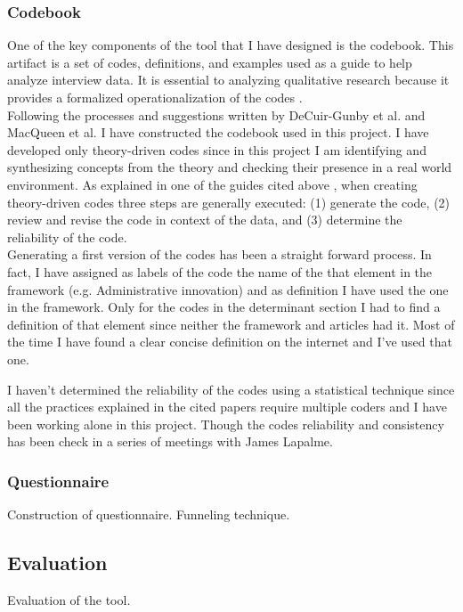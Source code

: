 \subsubsection*{Codebook}
One of the key components of the tool that I have designed is the codebook. This artifact is a set of codes, definitions, and examples used as a guide to help analyze interview data. It is essential to analyzing qualitative research because it provides a formalized operationalization of the codes \citep{CodebookGuide}. \\
Following the processes and suggestions written by DeCuir-Gunby et al. \citep{CodebookGuide} and MacQueen et al. \citep{CodebookGuide2} I have constructed the codebook used in this project.
I have developed only theory-driven codes since in this project I am identifying and synthesizing concepts from the theory and checking their presence in a real world environment. As explained in one of the guides cited above \citep{CodebookGuide}, when creating theory-driven codes three steps are generally executed: (1) generate the code, (2) review and revise the code in context of the data, and (3) determine the reliability of the code. \\

Generating a first version of the codes has been a straight forward process. In fact, I have assigned as labels of the code the name of the that element in the framework (e.g. Administrative innovation) and as definition I have used the one in the framework. Only for the codes in the determinant section I had to find a definition of that element since neither the framework and articles had it. Most of the time I have found a clear concise definition on the internet and I've used that one.


I haven't determined the reliability of the codes using a statistical technique since all the practices explained in the cited papers require multiple coders and I have been working alone in this project. Though the codes reliability and consistency has been check in a series of meetings with James Lapalme.

\subsubsection*{Questionnaire}
\label{methQuestionnaire}
Construction of questionnaire. Funneling technique.

\subsection{Evaluation}
Evaluation of the tool.


